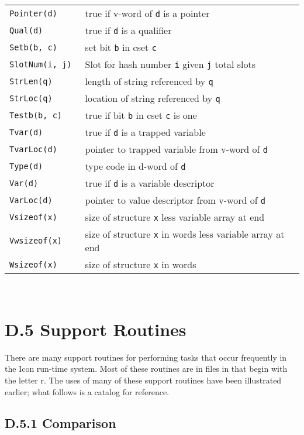 {\begin{xtabular}{>{\hspace{1cm}\texttt\bgroup}l<{\egroup}@{\hspace{1cm}}p{11cm}}
Pointer(d)        & true if v-word of \texttt{d} is a pointer\\
Qual(d)           & true if \texttt{d} is a qualifier\\
Setb(b, c)        & set bit \texttt{b} in cset \texttt{c}\\
SlotNum(i, j)     & Slot for hash number \texttt{i} given \texttt{j} total slots\\
StrLen(q)         & length of string referenced by \texttt{q}\\
StrLoc(q)         & location of string referenced by \texttt{q}\\
Testb(b, c)       & true if bit \texttt{b} in cset \texttt{c} is one\\
Tvar(d)           & true if \texttt{d} is a trapped variable\\
TvarLoc(d)        & pointer to trapped variable from v-word of \texttt{d}\\
Type(d)           & type code in d-word of \texttt{d}\\
Var(d)            & true if \texttt{d} is a variable descriptor\\
VarLoc(d)         & pointer to value descriptor from v-word of \texttt{d}\\
Vsizeof(x)        & size of structure \texttt{x} less variable array at end\\
Vwsizeof(x)       & size of structure \texttt{x} in words less variable array at end\\
Wsizeof(x)        & size of structure \texttt{x} in words\\
\end{xtabular}
}\\[1ex]

\section[D.5 Support Routines]{D.5 Support Routines}

There are many support routines for performing tasks that occur frequently in
the Icon run-time system. Most of these routines are in files in 
that begin with the letter r. The uses of many of these support routines have
been illustrated earlier; what follows is a catalog for reference.

\subsection[D.5.1 Comparison]{D.5.1 Comparison}

